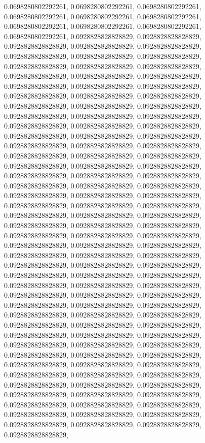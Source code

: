 \documentclass[
  ,man]{apa6}
\begin{document}
0.0698280802292261, 0.0698280802292261, 0.0698280802292261, 0.0698280802292261, 0.0698280802292261, 0.0698280802292261, 0.0698280802292261, 0.0698280802292261, 0.0698280802292261, 0.0698280802292261, 0.0928828828828829, 0.0928828828828829, 0.0928828828828829, 0.0928828828828829, 0.0928828828828829, 0.0928828828828829, 0.0928828828828829, 0.0928828828828829, 0.0928828828828829, 0.0928828828828829, 0.0928828828828829, 0.0928828828828829, 0.0928828828828829, 0.0928828828828829, 0.0928828828828829, 0.0928828828828829,
0.0928828828828829, 0.0928828828828829, 0.0928828828828829, 0.0928828828828829, 0.0928828828828829, 0.0928828828828829, 0.0928828828828829, 0.0928828828828829, 0.0928828828828829, 0.0928828828828829, 0.0928828828828829, 0.0928828828828829, 0.0928828828828829, 0.0928828828828829, 0.0928828828828829, 0.0928828828828829, 0.0928828828828829, 0.0928828828828829, 0.0928828828828829, 0.0928828828828829, 0.0928828828828829, 0.0928828828828829, 0.0928828828828829, 0.0928828828828829, 0.0928828828828829, 0.0928828828828829,
0.0928828828828829, 0.0928828828828829, 0.0928828828828829, 0.0928828828828829, 0.0928828828828829, 0.0928828828828829, 0.0928828828828829, 0.0928828828828829, 0.0928828828828829, 0.0928828828828829, 0.0928828828828829, 0.0928828828828829, 0.0928828828828829, 0.0928828828828829, 0.0928828828828829, 0.0928828828828829, 0.0928828828828829, 0.0928828828828829, 0.0928828828828829, 0.0928828828828829, 0.0928828828828829, 0.0928828828828829, 0.0928828828828829, 0.0928828828828829, 0.0928828828828829, 0.0928828828828829,
0.0928828828828829, 0.0928828828828829, 0.0928828828828829, 0.0928828828828829, 0.0928828828828829, 0.0928828828828829, 0.0928828828828829, 0.0928828828828829, 0.0928828828828829, 0.0928828828828829, 0.0928828828828829, 0.0928828828828829, 0.0928828828828829, 0.0928828828828829, 0.0928828828828829, 0.0928828828828829, 0.0928828828828829, 0.0928828828828829, 0.0928828828828829, 0.0928828828828829, 0.0928828828828829, 0.0928828828828829, 0.0928828828828829, 0.0928828828828829, 0.0928828828828829, 0.0928828828828829,
0.0928828828828829, 0.0928828828828829, 0.0928828828828829, 0.0928828828828829, 0.0928828828828829, 0.0928828828828829, 0.0928828828828829, 0.0928828828828829, 0.0928828828828829, 0.0928828828828829, 0.0928828828828829, 0.0928828828828829, 0.0928828828828829, 0.0928828828828829, 0.0928828828828829, 0.0928828828828829, 0.0928828828828829, 0.0928828828828829, 0.0928828828828829, 0.0928828828828829, 0.0928828828828829, 0.0928828828828829, 0.0928828828828829, 0.0928828828828829, 0.0928828828828829, 0.0928828828828829,
\end{document}
